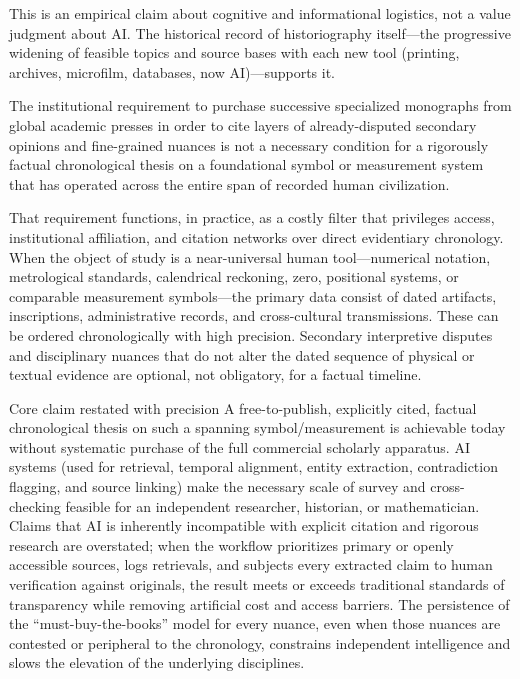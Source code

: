 This is an empirical claim about cognitive and informational logistics, not a value judgment about AI. The historical record of historiography itself—the progressive widening of feasible topics and source bases with each new tool (printing, archives, microfilm, databases, now AI)—supports it.

The institutional requirement to purchase successive specialized monographs from global academic presses in order to cite layers of already-disputed secondary opinions and fine-grained nuances is not a necessary condition for a rigorously factual chronological thesis on a foundational symbol or measurement system that has operated across the entire span of recorded human civilization.  

That requirement functions, in practice, as a costly filter that privileges access, institutional affiliation, and citation networks over direct evidentiary chronology. When the object of study is a near-universal human tool—numerical notation, metrological standards, calendrical reckoning, zero, positional systems, or comparable measurement symbols—the primary data consist of dated artifacts, inscriptions, administrative records, and cross-cultural transmissions. These can be ordered chronologically with high precision. Secondary interpretive disputes and disciplinary nuances that do not alter the dated sequence of physical or textual evidence are optional, not obligatory, for a factual timeline.

Core claim restated with precision
A free-to-publish, explicitly cited, factual chronological thesis on such a spanning symbol/measurement is achievable today without systematic purchase of the full commercial scholarly apparatus. AI systems (used for retrieval, temporal alignment, entity extraction, contradiction flagging, and source linking) make the necessary scale of survey and cross-checking feasible for an independent researcher, historian, or mathematician. Claims that AI is inherently incompatible with explicit citation and rigorous research are overstated; when the workflow prioritizes primary or openly accessible sources, logs retrievals, and subjects every extracted claim to human verification against originals, the result meets or exceeds traditional standards of transparency while removing artificial cost and access barriers. The persistence of the “must-buy-the-books” model for every nuance, even when those nuances are contested or peripheral to the chronology, constrains independent intelligence and slows the elevation of the underlying disciplines.

